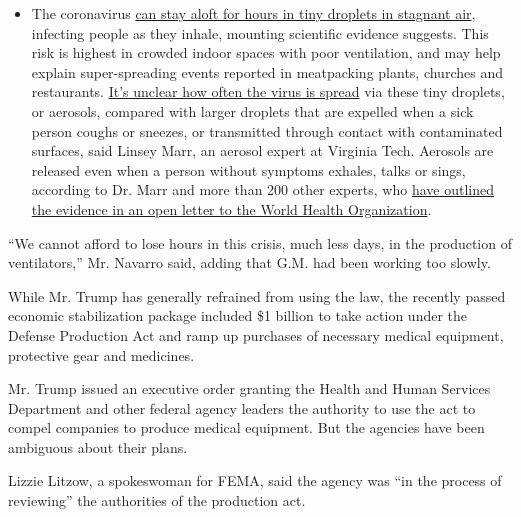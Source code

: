 \begin{itemize}
  \begin{itemize}
  \tightlist
  \item
    The coronavirus
    \href{https://www.nytimes3xbfgragh.onion/2020/07/04/health/239-experts-with-one-big-claim-the-coronavirus-is-airborne.html?action=click\&pgtype=Article\&state=default\&region=MAIN_CONTENT_3\&context=storylines_faq}{can
    stay aloft for hours in tiny droplets in stagnant air}, infecting
    people as they inhale, mounting scientific evidence suggests. This
    risk is highest in crowded indoor spaces with poor ventilation, and
    may help explain super-spreading events reported in meatpacking
    plants, churches and restaurants.
    \href{https://www.nytimes3xbfgragh.onion/2020/07/06/health/coronavirus-airborne-aerosols.html?action=click\&pgtype=Article\&state=default\&region=MAIN_CONTENT_3\&context=storylines_faq}{It's
    unclear how often the virus is spread} via these tiny droplets, or
    aerosols, compared with larger droplets that are expelled when a
    sick person coughs or sneezes, or transmitted through contact with
    contaminated surfaces, said Linsey Marr, an aerosol expert at
    Virginia Tech. Aerosols are released even when a person without
    symptoms exhales, talks or sings, according to Dr. Marr and more
    than 200 other experts, who
    \href{https://academic.oup.com/cid/article/doi/10.1093/cid/ciaa939/5867798}{have
    outlined the evidence in an open letter to the World Health
    Organization}.
  \end{itemize}
\end{itemize}

``We cannot afford to lose hours in this crisis, much less days, in the
production of ventilators,'' Mr. Navarro said, adding that G.M. had been
working too slowly.

While Mr. Trump has generally refrained from using the law, the recently
passed economic stabilization package included \$1 billion to take
action under the Defense Production Act and ramp up purchases of
necessary medical equipment, protective gear and medicines.

Mr. Trump issued an executive order granting the Health and Human
Services Department and other federal agency leaders the authority to
use the act to compel companies to produce medical equipment. But the
agencies have been ambiguous about their plans.

Lizzie Litzow, a spokeswoman for FEMA, said the agency was ``in the
process of reviewing'' the authorities of the production act.

